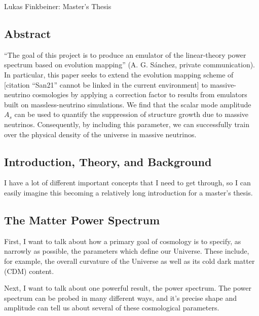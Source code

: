 \documentclass[11pt]{article}
\newcommand{\cbib}[1]
{\IfFileExists{biblatex.sty}
{\cite{#1}}
{[citation ``#1'' cannot be linked in the current environment]}}
\begin{document}
\fontsize{12}{15}

\begin{center}
Lukas Finkbeiner: Master's Thesis
\end{center}

\tableofcontents

\begin{centering}
\section{Abstract}
\end{centering}

``The goal of this project is to produce an emulator of the linear-theory
power spectrum based on evolution mapping'' (A. G. S\'{a}nchez, private
communication). In particular, this paper seeks to extend the evolution mapping
scheme of \cbib{San21} to massive-neutrino cosmologies by applying a correction
factor to results from emulators built on massless-neutrino simulations.  We find that the scalar mode amplitude $A_s$ can be used to quantify the suppression of structure growth due to massive neutrinos. Consequently, by including this parameter, we can successfully train over the physical density of the universe in massive neutrinos.

\begin{centering}
\section{Introduction, Theory, and Background}
\end{centering}

I have a lot of different important concepts that I need to get through, so I can easily imagine this becoming a relatively long introduction for a master's thesis.

\begin{centering}
\subsection{The Matter Power Spectrum}
\end{centering}

First, I want to talk about how a primary goal of cosmology is to specify, as narrowly as possible, the parameters which define our Universe. These include, for example, the overall curvature of the Universe as well as its cold dark matter (CDM) content.

Next, I want to talk about one powerful result, the power spectrum. The power spectrum can be probed in many different ways, and it's precise shape and amplitude can tell us about several of these cosmological parameters.
\end{document}
